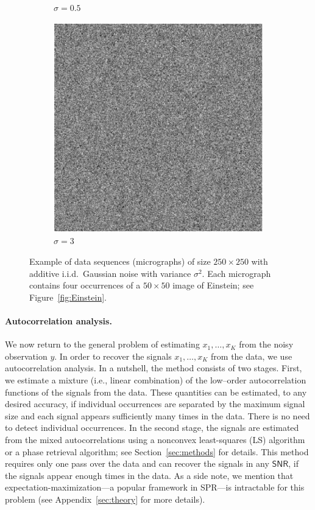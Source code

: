 \documentclass[english,11pt]{article}
\numberwithin{equation}{section}
\theoremstyle{plain}
\theoremstyle{definition}
\theoremstyle{remark}
\theoremstyle{plain}
\theoremstyle{remark}
\theoremstyle{plain}
\theoremstyle{plain}
\newcommand{\SNR}{{\textsf{SNR}}}
\begin{document}
\begin{figure}[h!]
\begin{subfigure}[h]{0.33\textwidth}
		\caption{$\sigma = 0.5$}
	\end{subfigure}
	\begin{subfigure}[h]{0.33\textwidth}
		\centering
		\includegraphics[scale=0.5]{micrograph_Einstein_example_s3}
		\caption{$\sigma = 3$}
	\end{subfigure}
	\caption{\label{fig:micro_example} Example of data sequences (micrographs) of size $250\times 250$ with additive i.i.d.\ Gaussian noise with variance $\sigma^2$. Each micrograph contains four occurrences of a $50 \times 50$ image of Einstein; see Figure~\ref{fig:Einstein}.}	
\end{figure}


\paragraph{Autocorrelation analysis.}
We now return to the general problem of estimating $x_1,\dots,x_K$ from the noisy observation $y$.
In order to recover the signals $x_1,\dots,x_K$ from the data, we use autocorrelation analysis.
In a nutshell, the method consists of two stages. First, we estimate a mixture (i.e., linear combination) of the low--order autocorrelation functions of the signals from the data. These quantities can be estimated, to any desired accuracy, if individual occurrences are separated by the maximum signal size and each signal appears sufficiently many times in the data. There is no need to detect individual occurrences.
In the second stage, the signals are estimated from the mixed autocorrelations using a nonconvex least-squares (LS) algorithm or a phase retrieval algorithm; see Section~\ref{sec:methods} for details.
This method requires only one pass over the data and can recover the signals in any $\SNR$, if the signals appear enough times in the data. As a side note, we mention that expectation-maximization---a popular framework in SPR---is intractable for this problem (see Appendix~\ref{sec:theory}  for more details). 
\end{document}

